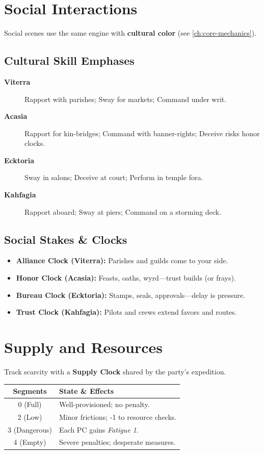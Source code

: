 \section{Social Interactions}
\label{sec:social-interactions}
Social scenes use the same engine with \textbf{cultural color} (see \ref{ch:core-mechanics}).

\subsection*{Cultural Skill Emphases}
\label{sec:cultural-skills}
\begin{description}
\item[\textbf{Viterra}]  Rapport with parishes; Sway for markets; Command under writ.
\item[\textbf{Acasia}]  Rapport for kin-bridges; Command with banner-rights; Deceive risks honor clocks.
\item[\textbf{Ecktoria}]  Sway in salons; Deceive at court; Perform in temple fora.
\item[\textbf{Kahfagia}]  Rapport aboard; Sway at piers; Command on a storming deck.
\end{description}

\subsection*{Social Stakes \& Clocks}
\label{sec:social-clocks}
\begin{itemize}
\item \textbf{Alliance Clock (Viterra):} Parishes and guilds come to your side.
\item \textbf{Honor Clock (Acasia):} Feasts, oaths, wyrd—trust builds (or frays).
\item \textbf{Bureau Clock (Ecktoria):} Stamps, seals, approvals—delay is pressure.
\item \textbf{Trust Clock (Kahfagia):} Pilots and crews extend favors and routes.
\end{itemize}

\section{Supply and Resources}
\label{sec:supply}
Track scarcity with a \textbf{Supply Clock} shared by the party's expedition.
\begin{center}
\begin{longtable}{cl}
\toprule
\textbf{Segments} & \textbf{State \& Effects} \\
\midrule
0 (Full) & Well-provisioned; no penalty. \\
2 (Low) & Minor frictions; -1 to resource checks. \\
3 (Dangerous) & Each PC gains \emph{Fatigue 1}. \\
4 (Empty) & Severe penalties; desperate measures. \\
\bottomrule
\end{longtable}
\end{center}

